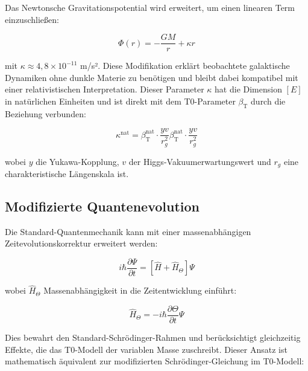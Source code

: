 \documentclass[12pt,a4paper]{article}
\newcommand{\betaT}{\beta_{\text{T}}}
\begin{document}
	Das Newtonsche Gravitationspotential wird erweitert, um einen linearen Term einzuschließen\cite{pascher_galaxies_2025}:
	
	\begin{equation}
		\label{eq:extended_potential}
		\Phi(r) = -\frac{GM}{r} + \kappa r
	\end{equation}
	
	mit $\kappa \approx 4,8\times10^{-11}$ m/s². Diese Modifikation erklärt beobachtete galaktische Dynamiken ohne dunkle Materie zu benötigen\cite{mcgaugh2016} und bleibt dabei kompatibel mit einer relativistischen Interpretation. Dieser Parameter $\kappa$ hat die Dimension $[E]$ in natürlichen Einheiten\cite{pascher_params_2025} und ist direkt mit dem T0-Parameter $\betaT$ durch die Beziehung verbunden:
	
	\begin{equation}
		\label{eq:kappa_beta}
		\kappa^{\text{nat}} = \betaT^{\text{nat}} \cdot \frac{yv}{r_g^2}\betaT^{\text{nat}} \cdot \frac{yv}{r_g^2}
	\end{equation}
	
	wobei $y$ die Yukawa-Kopplung, $v$ der Higgs-Vakuumerwartungswert und $r_g$ eine charakteristische Längenskala ist\cite{pascher_lagrange_2025}.
	
	\subsection{Modifizierte Quantenevolution}
	\label{subsec:quantum_evolution}
	
	Die Standard-Quantenmechanik\cite{schrodinger1926} kann mit einer massenabhängigen Zeitevolutionskorrektur erweitert werden:
	
	\begin{equation}
		\label{eq:extended_schrodinger}
		i\hbar\frac{\partial\Psi}{\partial t} = [\hat{H} + \hat{H}_{\Theta}]\Psi
	\end{equation}
	
	wobei $\hat{H}_{\Theta}$ Massenabhängigkeit in die Zeitentwicklung einführt:
	
	\begin{equation}
		\label{eq:h_theta}
		\hat{H}_{\Theta} = -i\hbar\frac{\partial\Theta}{\partial t}\Psi
	\end{equation}
	
	Dies bewahrt den Standard-Schrödinger-Rahmen und berücksichtigt gleichzeitig Effekte, die das T0-Modell der variablen Masse zuschreibt\cite{pascher_zeit_2025}. Dieser Ansatz ist mathematisch äquivalent zur modifizierten Schrödinger-Gleichung im T0-Modell\cite{pascher_lagrange_2025}:
	
\end{document}
